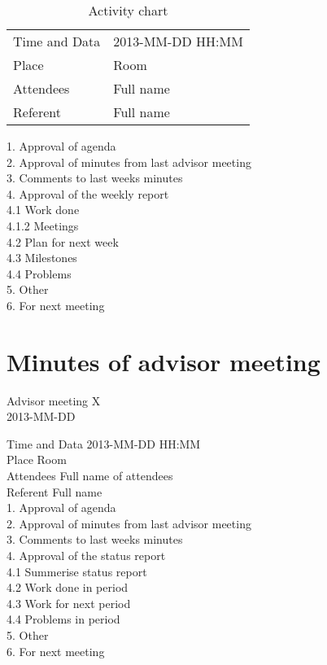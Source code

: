 \begin{table}
\begin{center}
\begin{tabular}{ l | l }
Time and Data & 2013-MM-DD HH:MM \\
Place & Room \\
Attendees & Full name \\
Referent & Full name \\
\end{tabular}
\end{center}
\caption{Activity chart}
\label{table:activityChart}
\end{table}


1. Approval of agenda \\
2. Approval of minutes from last advisor meeting \\
3. Comments to last weeks minutes \\
4. Approval of the weekly report \\
4.1 Work done \\
4.1.2 Meetings \\
4.2 Plan for next week \\
4.3 Milestones \\
4.4 Problems \\
5. Other \\
6. For next meeting \\


\section{Minutes of advisor meeting}

\begin{center}
Advisor meeting X \\
2013-MM-DD \\
\end{center}

Time and Data 	2013-MM-DD HH:MM \\
Place 			Room \\
Attendees  		Full name of attendees \\
Referent 		Full name \\

1. Approval of agenda \\
2. Approval of minutes from last advisor meeting \\
3. Comments to last weeks minutes \\
4. Approval of the status report \\
4.1 Summerise status report \\
4.2 Work done in period \\
4.3 Work for next period \\
4.4 Problems in period \\
5. Other \\
6. For next meeting \\
 

